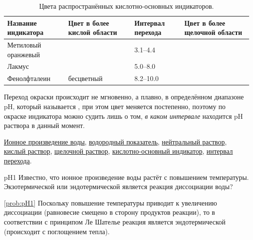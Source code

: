 \begin{table}[htbp]
    \small
    \caption{Цвета распространённых кислотно-основных индикаторов.}
    \label{tab:pH_indicator_colors}
    \begin{tabularx}{\textwidth}{
        >{\hsize}Y
        >{\hsize}Z
        >{\hsize}Z
        >{\hsize}Z
        }
        \hline
        Название индикатора & Цвет в более кислой области & Интервал перехода & Цвет в более щелочной области \\
        \hline
        Метиловый оранжевый &  & \num{3,1}--\num{4,4} &  \\
        \hline
        Лакмус &  & \num{5,0}--\num{8,0} &  \\
        \hline
        Фенолфталеин & бесцветный & \num{8,2}--\num{10,0} &  \\
        \hline
    \end{tabularx}
\end{table}

Переход окраски происходит не мгновенно, а плавно, в определённом диапазоне pH, который называется , при этом цвет меняется постепенно, поэтому по окраске индикатора можно судить лишь о том, \emph{в каком интервале} находится pH раствора в данный момент.

\begin{termlist}
    \hyperref[term:ionic_product_of_water]{Ионное произведение воды},
    \hyperref[term:pH]{водородный показатель},
    \hyperref[term:neutral_solution_pH]{нейтральный раствор},
    \hyperref[term:acidic_solution_pH]{кислый раствор},
    \hyperref[term:alkaline_solution_pH]{щелочной раствор},
    \hyperref[term:acid_base_indicator]{кислотно-основный индикатор},
    \hyperref[term:color_change_interval]{интервал перехода}.
\end{termlist}

\begin{problem}{}{pH1}
    Известно, что ионное произведение воды растёт с повышением температуры. Экзотермической или эндотермической является реакция диссоциации воды?
    \begin{sol}{\ref{prob:pH1}}
        Поскольку повышение температуры приводит к увеличению диссоциации (равновесие смещено в сторону продуктов реакции), то в соответствии с принципом Ле Шателье реакция является эндотермической (происходит с поглощением тепла).
    \end{sol}
\end{problem}

